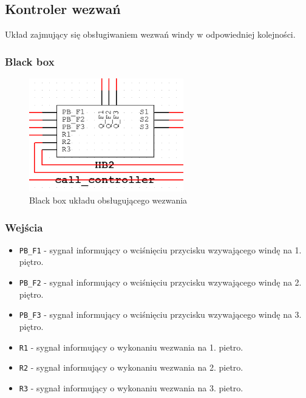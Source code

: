 \documentclass[a4paper]{article}
\begin{document}
\pagebreak
\subsection{Kontroler wezwań}
Układ zajmujący się obsługiwaniem wezwań windy w odpowiedniej kolejności.

\subsubsection{Black box}
\begin{figure}[H]
    \centering
    \includegraphics[width=0.6\textwidth]{call_controller.png}
    \caption{Black box układu obsługującego wezwania}
\end{figure}

\subsubsection{Wejścia}
\begin{itemize}
    \item \verb|PB_F1| - sygnał informujący o wciśnięciu przycisku wzywającego windę na 1. piętro.
    \item \verb|PB_F2| - sygnał informujący o wciśnięciu przycisku wzywającego windę na 2. piętro.
    \item \verb|PB_F3| - sygnał informujący o wciśnięciu przycisku wzywającego windę na 3. piętro.
    \item \verb|R1| - sygnał informujący o wykonaniu wezwania na 1. pietro.
    \item \verb|R2| - sygnał informujący o wykonaniu wezwania na 2. pietro.
    \item \verb|R3| - sygnał informujący o wykonaniu wezwania na 3. pietro.
\end{itemize}
\end{document}
